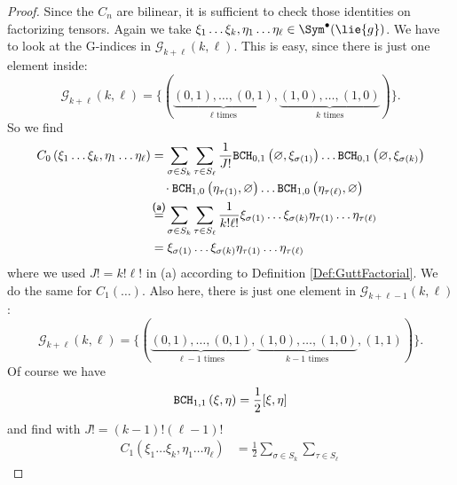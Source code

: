 \begin{proof}
	Since the $C_n$ are bilinear, it is sufficient to check those identities 
	on factorizing tensors. Again we take $\xi_1 \ldots \xi_k, \eta_1 \ldots 
	\eta_{\ell} \in \Sym^{\bullet}(\lie{g})$. We have to look at the 
	G-indices in $\mathcal{G}_{k + \ell}(k, \ell)$. This is easy, since there 
	is just one element inside:
	\begin{equation*}
		\mathcal{G}_{k + \ell}(k, \ell)
		=
		\Big\{
			( 
				\underbrace{(0,1), \ldots, (0,1)}_{
				\ell \text{ times}
				}
				,
				\underbrace{(1,0), \ldots, (1,0)}_{
				k \text{ times}
				}
			)
		\Big\}.
	\end{equation*}
	So we find
	\begin{align*}
		C_0 
		\left(
			\xi_1 \ldots \xi_k, \eta_1 \ldots \eta_{\ell}
		\right)
		& =
		\sum\limits_{\sigma \in S_k}
		\sum\limits_{\tau \in S_{\ell}}
		\frac{1}{J!}
		\bchparts{0}{1}{\varnothing}{\xi_{\sigma(1)}}
		\ldots
		\bchparts{0}{1}{\varnothing}{\xi_{\sigma(k)}}
		\\
		& \quad \cdot
		\bchparts{1}{0}{\eta_{\tau(1)}}{\varnothing}
		\ldots
		\bchparts{1}{0}{\eta_{\tau(\ell)}}{\varnothing}
		\\
		& \ot{(a)}{=}
		\sum\limits_{\sigma \in S_k}
		\sum\limits_{\tau \in S_{\ell}}
		\frac{1}{k! \ell!}
		\xi_{\sigma(1)} \ldots \xi_{\sigma(k)}
		\eta_{\tau(1)} \ldots \eta_{\tau(\ell)}
		\\
		& =
		\xi_{\sigma(1)} \ldots \xi_{\sigma(k)}
		\eta_{\tau(1)} \ldots \eta_{\tau(\ell)}
	\end{align*}
	where we used $J! = k! \ell!$ in (a) according to Definition 
	\ref{Def:GuttFactorial}. We do the same for $C_1(\ldots)$. Also here, 
	there is just one element in $\mathcal{G}_{k + \ell - 1}(k, \ell)$:
		\begin{equation*}
		\mathcal{G}_{k + \ell}(k, \ell)
		=
		\Big\{
			( 
				\underbrace{(0,1), \ldots, (0,1)}_{
				\ell-1 \text{ times}
				}
				,
				\underbrace{(1,0), \ldots, (1,0)}_{
				k-1 \text{ times}
				}
				,
				(1,1)
			)
		\Big\}.
	\end{equation*}
	Of course we have
	\begin{equation*}
		\mathtt{BCH}_{1, 1}\left(\xi, \eta\right)
		=
		\frac{1}{2} [\xi, \eta]
	\end{equation*}
	and find with $J! = (k - 1)! (\ell - 1)!$ 
	\begin{align*}
		C_1 
		\left(
			\xi_1 \ldots \xi_k, \eta_1 \ldots \eta_{\ell}
		\right)
		& =
		\frac{1}{2}
		\sum\limits_{\sigma \in S_k}
		\sum\limits_{\tau \in S_{\ell}}

\end{align*}
\end{proof}
